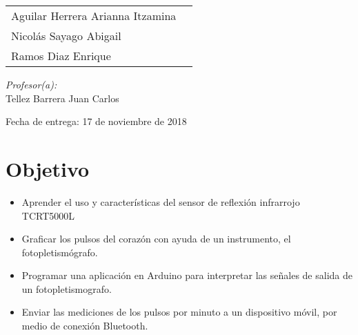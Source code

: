 \documentclass[12pt]{article}
\begin{document}
\begin{titlepage}
\begin{center}
\begin{minipage}{0.5\textwidth}
\begin{flushleft}
                        \begin{tabular}{ll}
                        Aguilar Herrera Arianna Itzamina \\
                        Nicolás Sayago Abigail\\
                        Ramos Diaz Enrique \\
                    \end{tabular}
                    \end{flushleft}
                \end{minipage}%
                \begin{minipage}{0.5\textwidth}
                    \begin{flushright} \large
                        \emph{Profesor(a):} \\
                        Tellez Barrera Juan Carlos  \\
                    \end{flushright}
                \end{minipage}
                
                \vfill
                
                {\large Fecha de entrega: 17 de noviembre de 2018}
            \end{center}
        \end{titlepage}
    
    \tableofcontents
    
    \section{Objetivo}
        \begin{itemize}
            \item[\checkmark] Aprender el uso y características del sensor de reflexión infrarrojo TCRT5000L
             \item[\checkmark] Graficar los pulsos del corazón con ayuda de un instrumento, el fotopletismógrafo. 
             \item[\checkmark] Programar una aplicación en Arduino para interpretar las señales de salida de un fotopletismografo.
             \item[\checkmark] Enviar las mediciones de los pulsos por minuto a un dispositivo móvil, por medio de conexión Bluetooth.
        \end{itemize}
    
\end{document}
